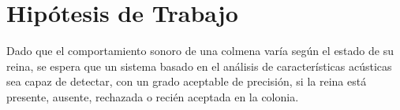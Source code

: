 \documentclass[12pt]{report}
\begin{document}
\section{Hipótesis de Trabajo}

Dado que el comportamiento sonoro de una colmena varía según el estado de su reina, se espera que un sistema basado en el análisis de características acústicas sea capaz de detectar, con un grado aceptable de precisión, si la reina está presente, ausente, rechazada o recién aceptada en la colonia.









\end{document}
